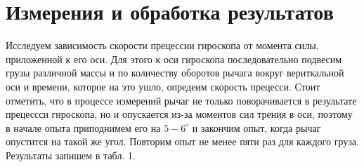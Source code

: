 \documentclass[12pt]{article}
\begin{document}
\section*{Измерения и обработка результатов}

Исследуем зависимость скорости прецессии гироскопа от момента силы, приложенной к его оси. Для этого к оси гироскопа последовательно подвесим грузы различной массы и по количеству оборотов рычага вокруг вериткальной оси и времени, которое на это ушло, опредеим скорость прецесси. Стоит отметить, что в процессе измерений рычаг не только поворачивается в результате прецессси гироскопа, но и опускается из-за моментов сил трения в оси, поэтому в начале опыта приподнимем его на $5-6^\circ$ и закончим опыт, когда рычаг опустится на такой же угол.
Повторим опыт не менее пяти раз для каждого груза. Результаты запишем в табл. 1.
\end{document}
